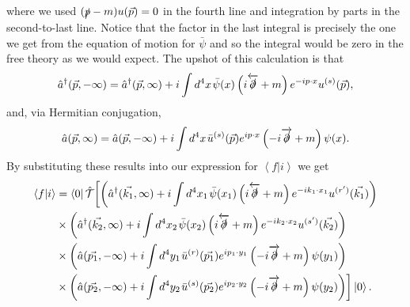 where we used $(\slashed{p} - m)u(\vec{p}) = 0$ in the fourth line and integration by parts in the second-to-last line. Notice that the factor in the last integral is precisely the one we get from the equation of motion for $\bar{\psi}$ and so the integral would be zero in the free theory as we would expect. The upshot of this calculation is that
\begin{equation}
\hat{a}^\dagger(\vec{p},-\infty) = \hat{a}^\dagger(\vec{p},\infty) + i \int d^4 x \hspace{1pt} \bar{\psi}(x) \left(i \overleftarrow{\slashed{\partial}} + m \right) e^{- i p \cdot x} u^{(s)}(\vec{p}),
\end{equation}
and, via Hermitian conjugation,
\begin{equation}
\hat{a}(\vec{p},\infty) = \hat{a}(\vec{p},-\infty) + i \int d^4 x \hspace{1pt} \bar{u}^{(s)}(\vec{p}) e^{i p \cdot x} \left(-i \overrightarrow{\slashed{\partial}} + m \right)  \psi(x).
\end{equation} %
By substituting these results into our expression for $\left<f | i \right>$ we get
\begin{equation}
\begin{split}
\left<f | i \right> & =  \left < 0 \right | \hat{\mathcal{T}} \biggl[ \left (\hat{a}^\dagger(\vec{k_1},\infty) + i \int d^4 x_1 \hspace{1pt} \bar{\psi}(x_1) \left(i \overleftarrow{\slashed{\partial}} + m \right) e^{- i k_1 \cdot x_1} u^{(r')}(\vec{k_1}) 
 \right ) \\
  & \times  \left (\hat{a}^\dagger(\vec{k_2},\infty) + i \int d^4 x_2 \hspace{1pt} \bar{\psi}(x_2) \left(i \overleftarrow{\slashed{\partial}} + m \right) e^{- i k_2 \cdot x_2} u^{(s')}(\vec{k_2}) 
 \right ) \\
  & \times  \left (\hat{a}(\vec{p_1},-\infty) + i \int d^4 y_1 \hspace{1pt} \bar{u}^{(r)}(\vec{p_1}) e^{i p_1 \cdot y_1} \left(-i \overrightarrow{\slashed{\partial}} + m \right)  \psi(y_1)
 \right ) \\
  & \times   \left (\hat{a}(\vec{p_2},-\infty) + i \int d^4 y_2 \hspace{1pt} \bar{u}^{(s)}(\vec{p_2}) e^{i p_2 \cdot y_2} \left(-i \overrightarrow{\slashed{\partial}} + m \right)  \psi(y_2)
 \right ) \biggr ] \left| 0 \right>.
\end{split}
\end{equation}
